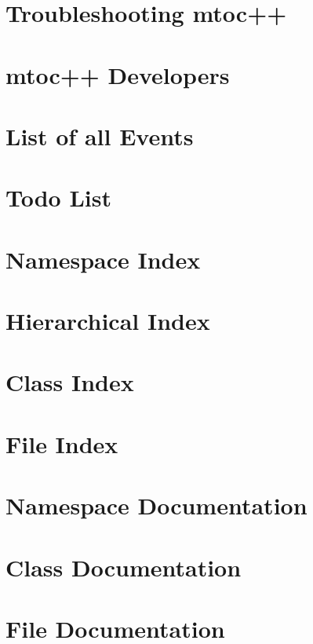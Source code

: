 \documentclass[twoside]{article}
\newcommand{\+}{\discretionary{\mbox{\scriptsize$\hookleftarrow$}}{}{}}
\newcommand{\clearemptydoublepage}{%
  \newpage{\pagestyle{empty}\cleardoublepage}%
}
\begin{document}
\section{Troubleshooting mtoc++}
\label{troubleshooting}
\hypertarget{troubleshooting}{}

\section{mtoc++ Developers}
\label{developers}
\hypertarget{developers}{}

\section{List of all Events}
\label{event}
\hypertarget{event}{}

\section{Todo List}
\label{todo}
\hypertarget{todo}{}

\section{Namespace Index}

\section{Hierarchical Index}

\section{Class Index}

\section{File Index}

\section{Namespace Documentation}

\section{Class Documentation}

























\section{File Documentation}


\backmatter
\newpage
{}
\clearemptydoublepage
{}
\printindex
\end{document}
